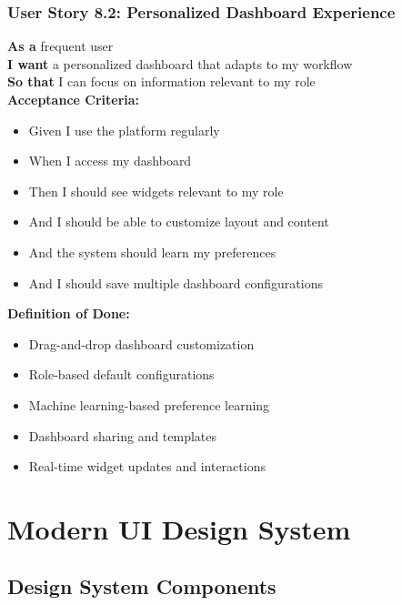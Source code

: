 \subsubsection{User Story 8.2: Personalized Dashboard Experience}

\begin{tcolorbox}[colback=lightgray, colframe=primaryblue, title=US-8.2: Personalized Dashboard Experience]
\textbf{As a} frequent user \\
\textbf{I want} a personalized dashboard that adapts to my workflow \\
\textbf{So that} I can focus on information relevant to my role \\

\textbf{Acceptance Criteria:}
\begin{itemize}
    \item Given I use the platform regularly
    \item When I access my dashboard
    \item Then I should see widgets relevant to my role
    \item And I should be able to customize layout and content
    \item And the system should learn my preferences
    \item And I should save multiple dashboard configurations
\end{itemize}

\textbf{Definition of Done:}
\begin{itemize}
    \item Drag-and-drop dashboard customization
    \item Role-based default configurations
    \item Machine learning-based preference learning
    \item Dashboard sharing and templates
    \item Real-time widget updates and interactions
\end{itemize}
\end{tcolorbox}

\section{Modern UI Design System}

\subsection{Design System Components}

